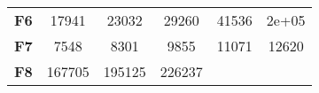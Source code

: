 \documentclass[12pt,a4paper]{article}
\begin{document}
\begin{longtable}[c]{@{}cccccc@{}}
\begin{minipage}[t]{0.12\columnwidth}
\textbf{F6}
\strut\end{minipage} &
\begin{minipage}[t]{0.08\columnwidth}\centering\strut
17941
\strut\end{minipage} &
\begin{minipage}[t]{0.08\columnwidth}\centering\strut
23032
\strut\end{minipage} &
\begin{minipage}[t]{0.09\columnwidth}\centering\strut
29260
\strut\end{minipage} &
\begin{minipage}[t]{0.10\columnwidth}\centering\strut
41536
\strut\end{minipage} &
\begin{minipage}[t]{0.10\columnwidth}\centering\strut
2e+05
\strut\end{minipage}\tabularnewline
\begin{minipage}[t]{0.12\columnwidth}\centering\strut
\textbf{F7}
\strut\end{minipage} &
\begin{minipage}[t]{0.08\columnwidth}\centering\strut
7548
\strut\end{minipage} &
\begin{minipage}[t]{0.08\columnwidth}\centering\strut
8301
\strut\end{minipage} &
\begin{minipage}[t]{0.09\columnwidth}\centering\strut
9855
\strut\end{minipage} &
\begin{minipage}[t]{0.10\columnwidth}\centering\strut
11071
\strut\end{minipage} &
\begin{minipage}[t]{0.10\columnwidth}\centering\strut
12620
\strut\end{minipage}\tabularnewline
\begin{minipage}[t]{0.12\columnwidth}\centering\strut
\textbf{F8}
\strut\end{minipage} &
\begin{minipage}[t]{0.08\columnwidth}\centering\strut
167705
\strut\end{minipage} &
\begin{minipage}[t]{0.08\columnwidth}\centering\strut
195125
\strut\end{minipage} &
\begin{minipage}[t]{0.09\columnwidth}\centering\strut
226237
\strut\end{minipage} &
\begin{minipage}[t]{0.10\columnwidth}\centering\strut

\end{minipage}
\end{longtable}
\end{document}
